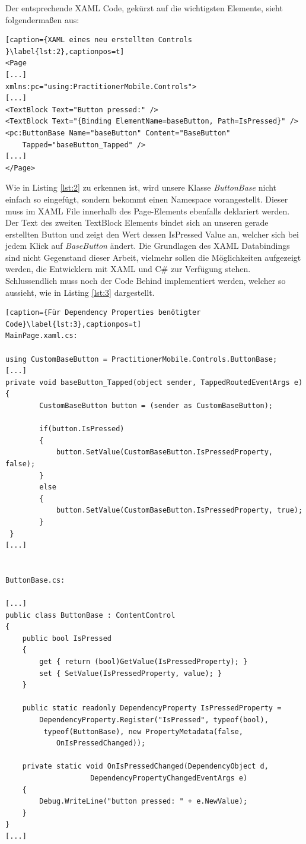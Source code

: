 \documentclass[a4paper,bibtotoc,oneside]{scrbook}
\begin{document}
\newline
Der entsprechende XAML Code, gekürzt auf die wichtigsten Elemente, sieht folgendermaßen aus:
\newline
\begin{lstlisting}[caption={XAML eines neu erstellten Controls }\label{lst:2},captionpos=t]
<Page
[...]
xmlns:pc="using:PractitionerMobile.Controls">
[...]
<TextBlock Text="Button pressed:" />
<TextBlock Text="{Binding ElementName=baseButton, Path=IsPressed}" />
<pc:ButtonBase Name="baseButton" Content="BaseButton" 
	Tapped="baseButton_Tapped" />
[...]
</Page>
\end{lstlisting}
Wie in Listing \ref{lst:2} zu erkennen ist, wird unsere Klasse \textit{ButtonBase} nicht einfach so eingefügt, sondern bekommt einen Namespace vorangestellt. Dieser muss im XAML File innerhalb des Page-Elements ebenfalls deklariert werden.
\newline
\newline
Der Text des zweiten TextBlock Elements bindet sich an unseren gerade erstellten Button und zeigt den Wert dessen IsPressed Value an, welcher sich bei jedem Klick auf \textit{BaseButton} ändert. Die Grundlagen des XAML Databindings sind nicht Gegenstand dieser Arbeit, vielmehr sollen die Möglichkeiten aufgezeigt werden, die Entwicklern mit XAML und C\# zur Verfügung stehen.
\newline
\newline
Schlussendlich muss noch der Code Behind implementiert werden, welcher so aussieht, wie in Listing \ref{lst:3} dargestellt.
\begin{lstlisting}[caption={Für Dependency Properties benötigter Code}\label{lst:3},captionpos=t]
MainPage.xaml.cs:

using CustomBaseButton = PractitionerMobile.Controls.ButtonBase;
[...]
private void baseButton_Tapped(object sender, TappedRoutedEventArgs e)
{
        CustomBaseButton button = (sender as CustomBaseButton);

        if(button.IsPressed)
        {
            button.SetValue(CustomBaseButton.IsPressedProperty, false);
        }
        else
        {
            button.SetValue(CustomBaseButton.IsPressedProperty, true);
        }
 }
[...]


ButtonBase.cs:

[...]
public class ButtonBase : ContentControl
{
    public bool IsPressed
    {
        get { return (bool)GetValue(IsPressedProperty); }
        set { SetValue(IsPressedProperty, value); }
    }

    public static readonly DependencyProperty IsPressedProperty = 
        DependencyProperty.Register("IsPressed", typeof(bool),
		 typeof(ButtonBase), new PropertyMetadata(false, 
			OnIsPressedChanged));

    private static void OnIsPressedChanged(DependencyObject d, 
					DependencyPropertyChangedEventArgs e)
    {
        Debug.WriteLine("button pressed: " + e.NewValue);
    }
}
[...]
\end{lstlisting}
\end{document}
